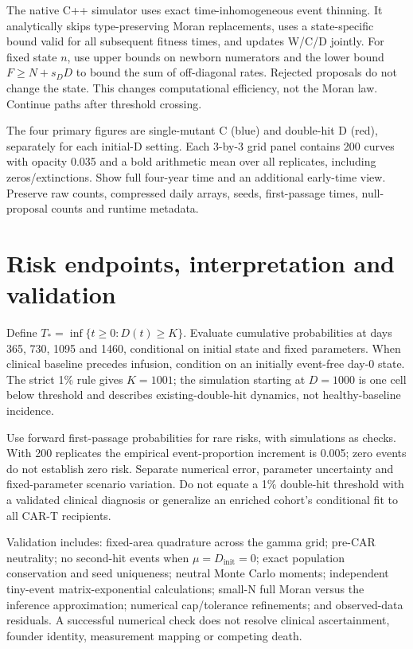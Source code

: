 \documentclass[11pt]{article}
\begin{document}
The native C++ simulator uses exact time-inhomogeneous event thinning. It analytically skips type-preserving Moran replacements, uses a state-specific bound valid for all subsequent fitness times, and updates W/C/D jointly. For fixed state $n$, use upper bounds on newborn numerators and the lower bound $F\ge N+s_DD$ to bound the sum of off-diagonal rates. Rejected proposals do not change the state. This changes computational efficiency, not the Moran law. Continue paths after threshold crossing.

The four primary figures are single-mutant C (blue) and double-hit D (red), separately for each initial-D setting. Each 3-by-3 grid panel contains 200 curves with opacity 0.035 and a bold arithmetic mean over all replicates, including zeros/extinctions. Show full four-year time and an additional early-time view. Preserve raw counts, compressed daily arrays, seeds, first-passage times, null-proposal counts and runtime metadata.

\section{Risk endpoints, interpretation and validation}
Define $T_*=\inf\{t\ge0:D(t)\ge K\}$. Evaluate cumulative probabilities at days 365, 730, 1095 and 1460, conditional on initial state and fixed parameters. When clinical baseline precedes infusion, condition on an initially event-free day-0 state. The strict 1\% rule gives $K=1001$; the simulation starting at $D=1000$ is one cell below threshold and describes existing-double-hit dynamics, not healthy-baseline incidence.

Use forward first-passage probabilities for rare risks, with simulations as checks. With 200 replicates the empirical event-proportion increment is 0.005; zero events do not establish zero risk. Separate numerical error, parameter uncertainty and fixed-parameter scenario variation. Do not equate a 1\% double-hit threshold with a validated clinical diagnosis or generalize an enriched cohort's conditional fit to all CAR-T recipients.

Validation includes: fixed-area quadrature across the gamma grid; pre-CAR neutrality; no second-hit events when $\mu=D_{\mathrm{init}}=0$; exact population conservation and seed uniqueness; neutral Monte Carlo moments; independent tiny-event matrix-exponential calculations; small-N full Moran versus the inference approximation; numerical cap/tolerance refinements; and observed-data residuals. A successful numerical check does not resolve clinical ascertainment, founder identity, measurement mapping or competing death.
\end{document}
